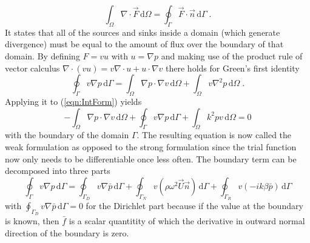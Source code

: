 \documentclass[%
  a4paper,oneside,%
  11pt,%
  smallchapters,
  green,%
  rgb, <cmyk>
  ]{tubsbook}
\begin{document}
\begin{equation}
\int_{\Omega}  \nabla \cdot \vec{F} \,\mathrm{d}\Omega = \oint_{\Gamma} \vec{F} \cdot \vec{n} \,\mathrm{d}\Gamma \; .
\label{eqn:DivTheo}
\end{equation}
It states that all of the sources and sinks inside a domain (which generate divergence) must be equal to the amount of flux over the boundary of that domain. 
By defining  $F = vu$ with $u = \nabla p$ and making use of the product rule of vector calculus $\nabla \cdot (v u) = v \nabla \cdot u + u \cdot \nabla v$ there holds for Green's first identity
\begin{equation}
\oint_{\Gamma} v \nabla p \,\mathrm{d}\Gamma = \int_{\Omega} \nabla p \cdot \nabla v \,\mathrm{d}\Omega + \int_{\Omega}  v\nabla^2 p \,\mathrm{d}\Omega \; .
\end{equation}
%
Applying it to (\ref{eqn:IntForm}) yields
\begin{equation}
-\int_{\Omega} \nabla p \cdot \nabla v \,\mathrm{d}\Omega + \oint_{\Gamma} v \nabla p  \,\mathrm{d}\Gamma+ \int_{\Omega} k^2 pv \,\mathrm{d}\Omega = 0
\label{eqn:WeakHelmholtz}
\end{equation}
with the boundary of the domain $\Gamma$.
The resulting equation is now called the weak formulation as opposed to the strong formulation since the trial function now only needs to be differentiable once less often.
The boundary term can be decomposed into three parts
\begin{equation}
\oint_{\Gamma} v \nabla p  \,\mathrm{d}\Gamma = \oint_{\Gamma_D} v \nabla \bar{p}  \,\mathrm{d}\Gamma + \oint_{\Gamma_N} v (\rho \omega^2 \vec{U}\vec{n})  \,\mathrm{d}\Gamma + \oint_{\Gamma_R} v(-ik\beta \bar{p})  \,\mathrm{d}\Gamma
\end{equation}
with $\oint_{\Gamma_D} v \nabla \bar{p}  \,\mathrm{d}\Gamma = 0$ for the Dirichlet part because if the value at the boundary is known, then $\bar{f}$ is a scalar quantitity of which the derivative in outward normal direction of the boundary is zero.
\end{document}

